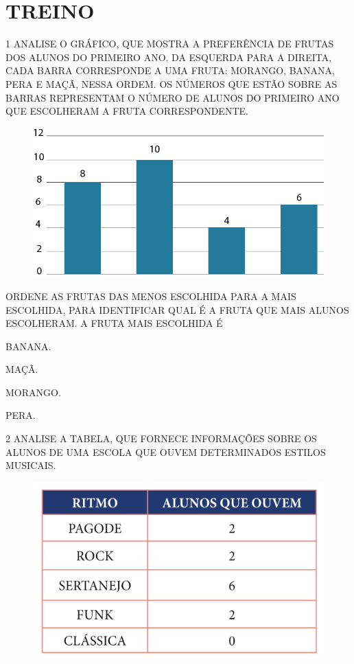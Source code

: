 \section*{TREINO}

\num{1} ANALISE O GRÁFICO, QUE MOSTRA A 
PREFERÊNCIA DE FRUTAS DOS ALUNOS DO PRIMEIRO 
ANO. DA ESQUERDA PARA A DIREITA, CADA BARRA 
CORRESPONDE A UMA FRUTA: MORANGO, BANANA, PERA 
E MAÇÃ, NESSA ORDEM. OS NÚMEROS QUE ESTÃO 
SOBRE AS BARRAS REPRESENTAM O NÚMERO DE ALUNOS 
DO PRIMEIRO ANO QUE ESCOLHERAM A FRUTA 
CORRESPONDENTE.

\begin{figure}[H]
\centering
\includegraphics[width=\textwidth]{./media/SAEB_1ANO_MAT_FIGURA109.png}
\end{figure}

ORDENE AS FRUTAS DAS MENOS ESCOLHIDA PARA A MAIS ESCOLHIDA, PARA IDENTIFICAR QUAL É A FRUTA QUE MAIS ALUNOS ESCOLHERAM. A FRUTA MAIS ESCOLHIDA É

\begin{escolha}
\item BANANA.

\item MAÇÃ.

\item MORANGO.

\item PERA.
\end{escolha}

\num{2} ANALISE A TABELA, QUE FORNECE INFORMAÇÕES SOBRE OS ALUNOS DE UMA ESCOLA QUE OUVEM DETERMINADOS ESTILOS MUSICAIS.

\begin{figure}[H]
\centering
\includegraphics[width=\textwidth]{./media/SAEB_1ANO_MAT_FIGURA110.png}
\end{figure}

